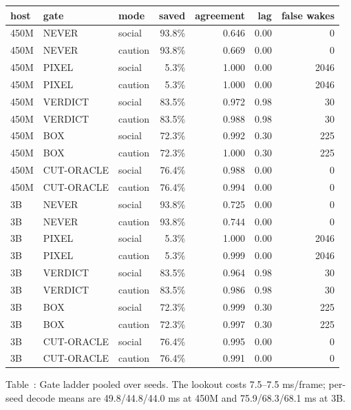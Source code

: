\documentclass[11pt]{article}
\begin{document}
\par\medskip

\begin{center}
{\scriptsize
\setlength{\tabcolsep}{3pt}%
\begin{tabular}{lllrrrr}
\toprule
host & gate & mode & saved & agreement & lag & false wakes \\
\midrule
450M & NEVER & social & 93.8\% & 0.646 & 0.00 & 0 \\
450M & NEVER & caution & 93.8\% & 0.669 & 0.00 & 0 \\
450M & PIXEL & social & 5.3\% & 1.000 & 0.00 & 2046 \\
450M & PIXEL & caution & 5.3\% & 1.000 & 0.00 & 2046 \\
450M & VERDICT & social & 83.5\% & 0.972 & 0.98 & 30 \\
450M & VERDICT & caution & 83.5\% & 0.988 & 0.98 & 30 \\
450M & BOX & social & 72.3\% & 0.992 & 0.30 & 225 \\
450M & BOX & caution & 72.3\% & 1.000 & 0.30 & 225 \\
450M & CUT-ORACLE & social & 76.4\% & 0.988 & 0.00 & 0 \\
450M & CUT-ORACLE & caution & 76.4\% & 0.994 & 0.00 & 0 \\
3B & NEVER & social & 93.8\% & 0.725 & 0.00 & 0 \\
3B & NEVER & caution & 93.8\% & 0.744 & 0.00 & 0 \\
3B & PIXEL & social & 5.3\% & 1.000 & 0.00 & 2046 \\
3B & PIXEL & caution & 5.3\% & 0.999 & 0.00 & 2046 \\
3B & VERDICT & social & 83.5\% & 0.964 & 0.98 & 30 \\
3B & VERDICT & caution & 83.5\% & 0.986 & 0.98 & 30 \\
3B & BOX & social & 72.3\% & 0.999 & 0.30 & 225 \\
3B & BOX & caution & 72.3\% & 0.997 & 0.30 & 225 \\
3B & CUT-ORACLE & social & 76.4\% & 0.995 & 0.00 & 0 \\
3B & CUT-ORACLE & caution & 76.4\% & 0.991 & 0.00 & 0 \\
\bottomrule
\end{tabular}
}
\end{center}
\noindent Table~\thetable: Gate ladder pooled over seeds. The lookout costs 7.5--7.5 ms/frame; per-seed decode means are 49.8/44.8/44.0 ms at 450M and 75.9/68.3/68.1 ms at 3B.
\label{tab:gates}
\par
\end{document}
